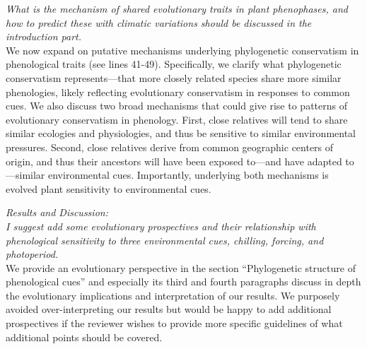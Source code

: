 \documentclass[11pt]{article}
\begin{document}
\emph{What is the mechanism of shared evolutionary traits in plant phenophases, and how to predict these with climatic variations should be discussed in the introduction part.}\\
We now expand on putative mechanisms underlying phylogenetic conservatism in phenological traits (see lines 41-49). Specifically, we clarify what phylogenetic conservatism represents---that more closely related species share more similar phenologies, likely reflecting evolutionary conservatism in responses to common cues. We also discuss two broad mechanisms that could give rise to patterns of evolutionary conservatism in phenology. First, close relatives will tend to share similar ecologies and physiologies, and thus be sensitive to similar environmental pressures. Second, close relatives derive from common geographic centers of origin, and thus their ancestors will have been exposed to---and have adapted to---similar environmental cues. Importantly, underlying both mechanisms is evolved plant sensitivity to environmental cues.


\emph{Results and Discussion:}\\
\emph{I suggest add some evolutionary prospectives and their relationship with phenological sensitivity to three environmental cues, chilling, forcing, and photoperiod.}\\
We provide an evolutionary perspective in the section ``Phylogenetic structure of phenological cues'' and especially its third and fourth paragraphs discuss in depth the evolutionary implications and interpretation of our results. We purposely avoided over-interpreting our results but would be happy to add additional prospectives if the reviewer wishes to provide more specific guidelines of what additional points should be covered.\\
\end{document}
